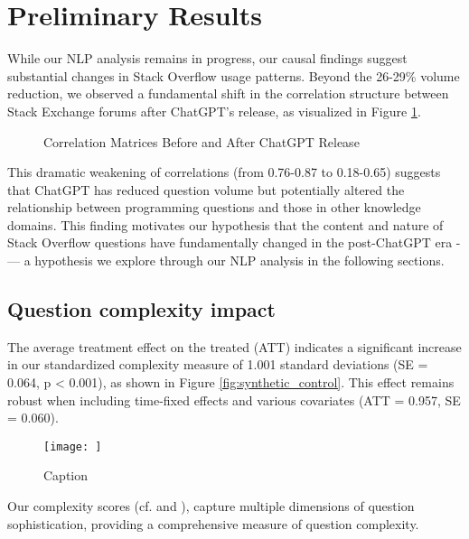 \section{Preliminary Results}
While our NLP analysis remains in progress, our causal findings suggest substantial changes in Stack Overflow usage patterns. Beyond the 26-29\% volume reduction, we observed a fundamental shift in the correlation structure between Stack Exchange forums after ChatGPT's release, as visualized in Figure \ref{fig:correlation_matrix}.

\begin{figure}[htpb!]
    \centering
    
    \caption{Correlation Matrices Before and After ChatGPT Release}
    \label{fig:correlation_matrix}
\end{figure}

This dramatic weakening of correlations (from 0.76-0.87 to 0.18-0.65) suggests that ChatGPT has reduced question volume but potentially altered the relationship between programming questions and those in other knowledge domains. This finding motivates our hypothesis that the content and nature of Stack Overflow questions have fundamentally changed in the post-ChatGPT era -— a hypothesis we explore through our NLP analysis in the following sections.


\subsection{Question complexity impact}

The average treatment effect on the treated (ATT) indicates a significant increase in our standardized complexity measure of 1.001 standard deviations (SE = 0.064, p < 0.001), as shown in Figure \ref{fig:synthetic_control}. This effect remains robust when including time-fixed effects and various covariates (ATT = 0.957, SE = 0.060).  

\begin{figure}[H]
    \centering
    \texttt{[image: ]}
    \caption{Caption}
    \label{fig:enter-label}
\end{figure}

Our complexity scores (cf.  and ), capture multiple dimensions of question sophistication, providing a comprehensive measure of question complexity.

